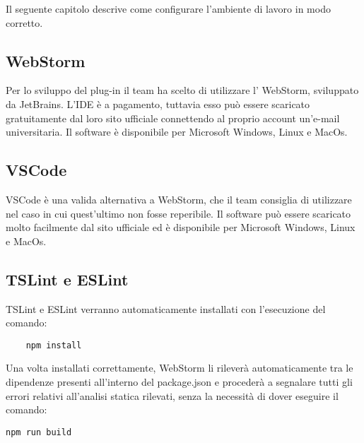 Il seguente capitolo descrive come configurare l'ambiente di lavoro in modo corretto.

\subsection{WebStorm}
Per lo sviluppo del plug-in il team ha scelto di utilizzare l' WebStorm, sviluppato da JetBrains. L'IDE è a pagamento, tuttavia esso può essere scaricato gratuitamente dal loro sito ufficiale connettendo al proprio account un'e-mail universitaria.
Il software è disponibile per Microsoft Windows, Linux e MacOs.
\subsection{VSCode}
VSCode è una valida alternativa a WebStorm, che il team consiglia di utilizzare nel caso in cui quest'ultimo non fosse reperibile.
Il software può essere scaricato molto facilmente dal sito ufficiale ed è disponibile per Microsoft Windows, Linux e MacOs.
\subsection{TSLint e ESLint}
TSLint e ESLint verranno automaticamente installati con l'esecuzione del comando:
\begin{verbatim}
	npm install
\end{verbatim}
Una volta installati correttamente, WebStorm li rileverà automaticamente tra le dipendenze presenti all'interno del package.json e procederà a segnalare tutti gli errori relativi all'analisi statica rilevati, senza la necessità di dover eseguire il comando:
\begin{verbatim}
npm run build
\end{verbatim}

\pagebreak